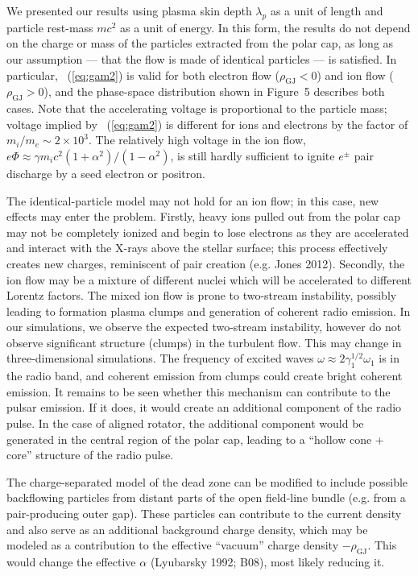We presented our results using plasma skin depth $\lambda_p$ as a unit of
length and particle rest-mass $mc^2$ as a unit of energy. In this form, the results
do not depend on the charge or mass of the particles extracted from the polar cap,
as long as our assumption --- that the flow is made of identical particles --- is
satisfied. In particular, \Eq~(\ref{eq:gam2}) is valid for both electron flow
($\rho_\mathrm{GJ}<0$) and ion flow ($\rho_\mathrm{GJ}>0$), and the phase-space
distribution shown in Figure~5 describes both cases.
Note that the accelerating voltage is proportional to the particle mass;
voltage implied by \Eq~(\ref{eq:gam2}) is different for ions and electrons by
the factor of $m_i/m_e\sim 2\times 10^3$.
The relatively high voltage in the ion flow,
$e\Phi\approx\gamma m_ic^2 (1+\alpha^2)/(1-\alpha^2)$,
is still hardly sufficient to ignite $e^\pm$ pair discharge by a seed electron or positron.

The identical-particle model may not hold for an ion flow; in this case,
new effects may enter the problem.
Firstly, heavy ions pulled out from the polar cap may not be completely ionized
and begin to lose electrons as they are accelerated and interact with the X-rays
above the stellar surface; this process effectively creates new charges,
reminiscent of pair creation (e.g. Jones 2012). Secondly, the ion flow may be a
mixture of different nuclei which will be accelerated to different Lorentz factors.
The mixed ion flow is prone to two-stream instability, possibly leading to formation
plasma clumps and generation of coherent radio emission.
In our simulations, we observe the expected two-stream instability,
however do not observe significant structure (clumps) in the turbulent flow.
This may change in three-dimensional simulations.
The frequency of excited waves $\omega\approx 2\gamma_1^{1/2}\omega_1$
is in the radio band, and coherent emission from clumps could create bright
coherent emission. It remains to be seen whether this mechanism
can contribute to the pulsar emission. If it does,
it would create an additional component of the radio pulse.
In the case of aligned rotator, the additional component would be generated in
the central region of the polar cap, leading to a ``hollow cone + core'' structure of
the radio pulse.

The charge-separated model of the dead zone can be modified to include possible
backflowing particles from distant parts of the open field-line bundle
(e.g. from a pair-producing outer gap). These particles can contribute to the current
density and also serve as an
additional background charge density, which may be modeled as a contribution to the
effective ``vacuum'' charge density  $-\rho_\mathrm{GJ}$.
This would change the effective $\alpha$ (Lyubarsky 1992; B08), most likely reducing it.

